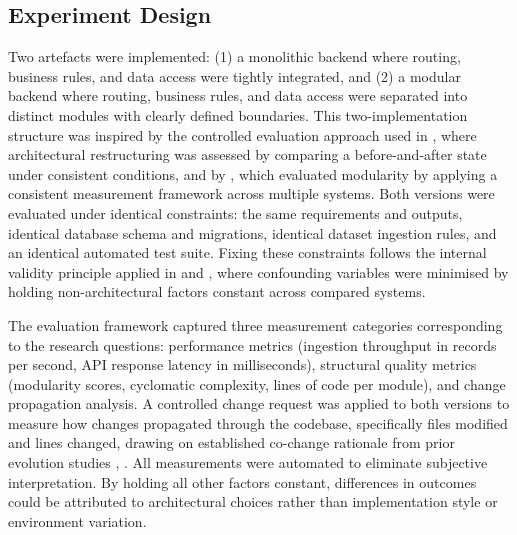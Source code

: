 \documentclass[conference]{IEEEtran}
\begin{document}
\subsection{Experiment Design}
Two artefacts were implemented: (1) a monolithic backend where routing, business rules, and data access were tightly integrated, and (2) a modular backend where routing, business rules, and data access were separated into distinct modules with clearly defined boundaries. This two-implementation structure was inspired by the controlled evaluation approach used in \cite{b7}, where architectural restructuring was assessed by comparing a before-and-after state under consistent conditions, and by \cite{b4}, which evaluated modularity by applying a consistent measurement framework across multiple systems. Both versions were evaluated under identical constraints: the same requirements and outputs, identical database schema and migrations, identical dataset ingestion rules, and an identical automated test suite. Fixing these constraints follows the internal validity principle applied in \cite{b3} and \cite{b6}, where confounding variables were minimised by holding non-architectural factors constant across compared systems.

The evaluation framework captured three measurement categories corresponding to the research questions: performance metrics (ingestion throughput in records per second, API response latency in milliseconds), structural quality metrics (modularity scores, cyclomatic complexity, lines of code per module), and change propagation analysis. A controlled change request was applied to both versions to measure how changes propagated through the codebase, specifically files modified and lines changed, drawing on established co-change rationale from prior evolution studies \cite{b3}, \cite{b7}. All measurements were automated to eliminate subjective interpretation. By holding all other factors constant, differences in outcomes could be attributed to architectural choices rather than implementation style or environment variation.
\end{document}
